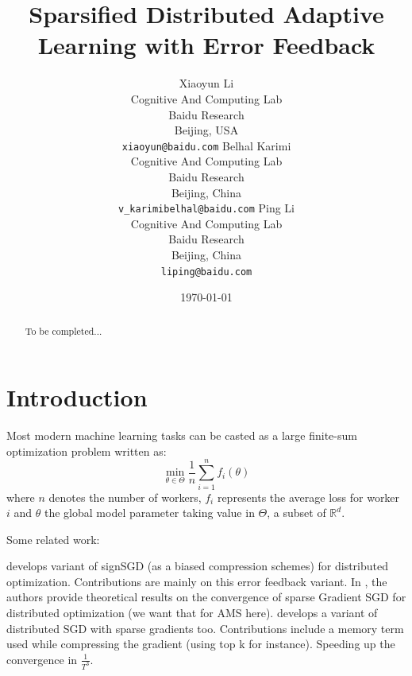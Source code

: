 \documentclass[11pt]{article}
\begin{document}
\title{Sparsified Distributed Adaptive Learning with Error Feedback}

\author{
Xiaoyun Li \\
  Cognitive And Computing Lab\\
  Baidu Research\\
  Beijing, USA \\
  \texttt{xiaoyun@baidu.com} 
   \And
  Belhal Karimi \\
  Cognitive And Computing Lab\\
  Baidu Research\\
  Beijing, China \\
  \texttt{v_karimibelhal@baidu.com} 
   \And
  Ping Li \\
  Cognitive And Computing Lab\\
  Baidu Research\\
  Beijing, China \\
  \texttt{liping@baidu.com} \\
}

\date{\today}

\maketitle

\begin{abstract}
To be completed...
\end{abstract}

\section{Introduction}\label{sec:introduction}

Most modern machine learning tasks can be casted as a large finite-sum optimization problem written as:
\begin{equation}\label{eq:opt}
\min \limits_{\theta \in \Theta} \frac{1}{n} \sum_{i=1}^n f_i(\theta)
\end{equation}
where $n$ denotes the number of workers, $f_i$ represents the average loss for worker $i$ and $\theta$ the global model parameter taking value in $\Theta$, a subset of $\mathbb{R}^d$.



Some related work:


\citep{karimireddy2019error} develops variant of signSGD (as a biased compression schemes) for distributed optimization. Contributions are mainly on this error feedback variant.
In \citep{shi2019convergence}, the authors provide theoretical results on the convergence of sparse Gradient SGD for distributed optimization (we want that for AMS here).
\citep{stich2018sparsified} develops a variant of distributed SGD with sparse gradients too. Contributions include a memory term used while compressing the gradient (using top k for instance). Speeding up the convergence in $\frac{1}{T^3}$.
\end{document}
